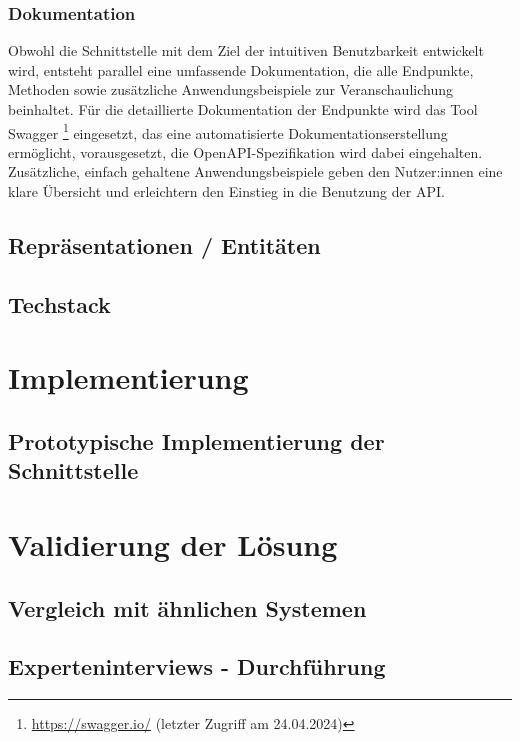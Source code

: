\documentclass[draft,final]{vutinfth} %
\begin{document}


\subsection{Dokumentation}

Obwohl die Schnittstelle mit dem Ziel der intuitiven Benutzbarkeit entwickelt wird, entsteht parallel eine umfassende Dokumentation, die alle Endpunkte, Methoden sowie zusätzliche Anwendungsbeispiele zur Veranschaulichung beinhaltet. 
Für die detaillierte Dokumentation der Endpunkte wird das Tool Swagger
\footnote{
	\url{https://swagger.io/} (letzter Zugriff am 24.04.2024)
} 
eingesetzt, das eine automatisierte Dokumentationserstellung ermöglicht, vorausgesetzt, die OpenAPI-Spezifikation wird dabei eingehalten. 
Zusätzliche, einfach gehaltene Anwendungsbeispiele geben den Nutzer:innen eine klare Übersicht und erleichtern den Einstieg in die Benutzung der API.


\section{Repräsentationen / Entitäten}


\section{Techstack}




\chapter{Implementierung}

\section{Prototypische Implementierung der Schnittstelle}



\chapter{Validierung der Lösung}

\section{Vergleich mit ähnlichen Systemen}

\section{Experteninterviews - Durchführung}
\end{document}
